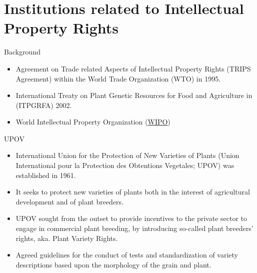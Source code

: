 \documentclass[ignorenonframetext,aspectratio=169]{beamer}
\providecommand{\tightlist}{%
  \setlength{\itemsep}{0pt}\setlength{\parskip}{0pt}}
\begin{document}
\hypertarget{institutions-related-to-intellectual-property-rights}{%
\section{Institutions related to Intellectual Property
Rights}\label{institutions-related-to-intellectual-property-rights}}

\begin{frame}{Background}
\protect\hypertarget{background-1}{}

\begin{itemize}
\tightlist
\item
  Agreement on Trade related Aspects of Intellectual Property Rights
  (TRIPS Agreement) within the World Trade Organization (WTO) in 1995.
\item
  International Treaty on Plant Genetic Resources for Food and
  Agriculture in (ITPGRFA) 2002.
\item
  World Intellectual Property Organization
  (\href{https://www.wipo.int/portal/en/index.html}{WIPO})
\end{itemize}

\end{frame}

\begin{frame}{UPOV}
\protect\hypertarget{upov}{}

\begin{itemize}
\tightlist
\item
  International Union for the Protection of New Varieties of Plants
  (Union International pour la Protection des Obtentions Vegetales;
  UPOV) was established in 1961.
\item
  It seeks to protect new varieties of plants both in the interest of
  agricultural development and of plant breeders.
\item
  UPOV sought from the outset to provide incentives to the private
  sector to engage in commercial plant breeding, by introducing
  so-called plant breeders' rights, aka. Plant Variety Rights.
\item
  Agreed guidelines for the conduct of tests and standardization of
  variety descriptions based upon the morphology of the grain and plant.
\end{itemize}

\end{frame}
\end{document}
